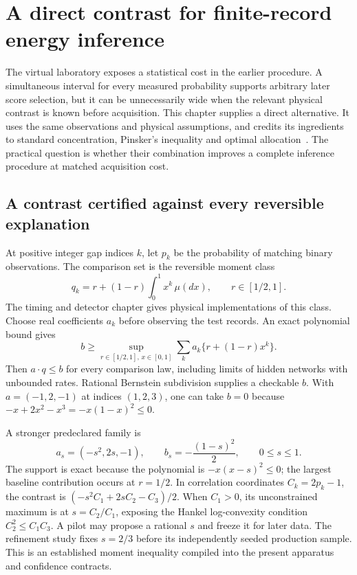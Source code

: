 \chapter{A direct contrast for finite-record energy inference}
\label{vl:contrast}

The virtual laboratory exposes a statistical cost in the earlier procedure.
A simultaneous interval for every measured probability supports arbitrary
later score selection, but it can be unnecessarily wide when the relevant
physical contrast is known before acquisition. This chapter supplies a direct
alternative. It uses the same observations and physical assumptions, and
credits its ingredients to standard concentration, Pinsker's inequality and
optimal allocation~\cite{caHoeffding1963,vlHoward2021,vlCochran1977}. The practical question is whether their combination
improves a complete inference procedure at matched acquisition cost.

\section{A contrast certified against every reversible explanation}
At positive integer gap indices $k$, let $p_k$ be the probability of matching
binary observations. The comparison set is the reversible moment class
\[
 q_k=r+(1-r)\int_0^1x^k\,\mu(dx),\qquad r\in[1/2,1].
\]
The timing and detector chapter gives physical implementations of this class.
Choose real coefficients $a_k$ before observing the test records. An exact
polynomial bound gives
\[
 b\geq\sup_{r\in[1/2,1],\,x\in[0,1]}
       \sum_k a_k\{r+(1-r)x^k\}.
\]
Then $a\cdot q\leq b$ for every comparison law, including limits of hidden
networks with unbounded rates. Rational Bernstein subdivision supplies a
checkable $b$. With $a=(-1,2,-1)$ at indices $(1,2,3)$, one can take $b=0$
because $-x+2x^2-x^3=-x(1-x)^2\leq0$.

A stronger predeclared family is
\[
 a_s=(-s^2,2s,-1),\qquad b_s=-\frac{(1-s)^2}{2},\qquad 0\leq s\leq1.
\]
The support is exact because the polynomial is $-x(x-s)^2\leq0$; the
largest baseline contribution occurs at $r=1/2$. In correlation coordinates
$C_k=2p_k-1$, the contrast is
$(-s^2C_1+2sC_2-C_3)/2$. When $C_1>0$, its unconstrained maximum is at
$s=C_2/C_1$, exposing the Hankel log-convexity condition
$C_2^2\leq C_1C_3$. A pilot may propose a rational $s$ and freeze it for later
data. The refinement study fixes $s=2/3$ before its independently seeded
production sample. This is an established moment inequality compiled into the
present apparatus and confidence contracts.

